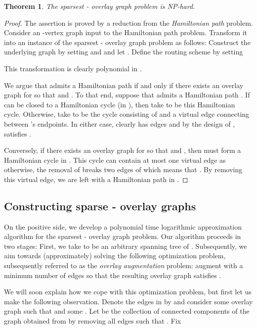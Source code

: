 \LongVersion \documentclass[11pt]{article}
\newtheorem{theorem}{Theorem}[section]
\theoremstyle{definition}
\theoremstyle{plain}
\begin{document}
\begin{theorem} \label{theorem:HardnessSparsestERDC}
The sparsest - overlay graph problem is NP-hard.
\end{theorem}
\begin{proof}
The assertion is proved by a reduction from the \emph{Hamiltonian path}
problem.
Consider an -vertex graph  input to the Hamiltonian path problem.
Transform it into an instance of the sparsest - overlay graph
problem as follows:
Construct the underlying graph  by setting  and  and let .
Define the routing scheme  by setting

This transformation is clearly polynomial in .

We argue that  admits a Hamiltonian path if and only if there exists an
overlay graph  for  so that  and .
To that end, suppose that  admits a Hamiltonian path .
If  can be closed to a Hamiltonian cycle (in ), then take  to be
this Hamiltonian cycle.
Otherwise, take  to be the cycle consisting of  and a virtual edge
connecting between 's endpoints.
In either case,  clearly has  edges and by the design of
,  satisfies .

Conversely, if there exists an overlay graph  for  so that
 and , then  must form a
Hamiltonian cycle  in .
This cycle can contain at most one virtual edge as otherwise, the removal of
 breaks two edges of  which means that .
By removing this virtual edge, we are left with a Hamiltonian path in .
\end{proof}

\subsection{Constructing sparse - overlay graphs}


On the positive side, we develop a polynomial time logarithmic approximation
algorithm for the sparsest - overlay graph problem.
Our algorithm proceeds in two stages:
First, we take  to be an arbitrary spanning tree of .
Subsequently, we aim towards (approximately) solving the following
optimization problem, subsequently referred to as the \emph{overlay
augmentation} problem:
augment  with a minimum number of  edges so that
the resulting overlay graph  satisfies .

We will soon explain how we cope with this optimization problem, but first let
us make the following observation.
Denote the edges in  by  and
consider some overlay graph  such that  and some .
Let  be the collection of connected components of the graph obtained
from  by removing all edges  such that .
Fix
\end{document}
